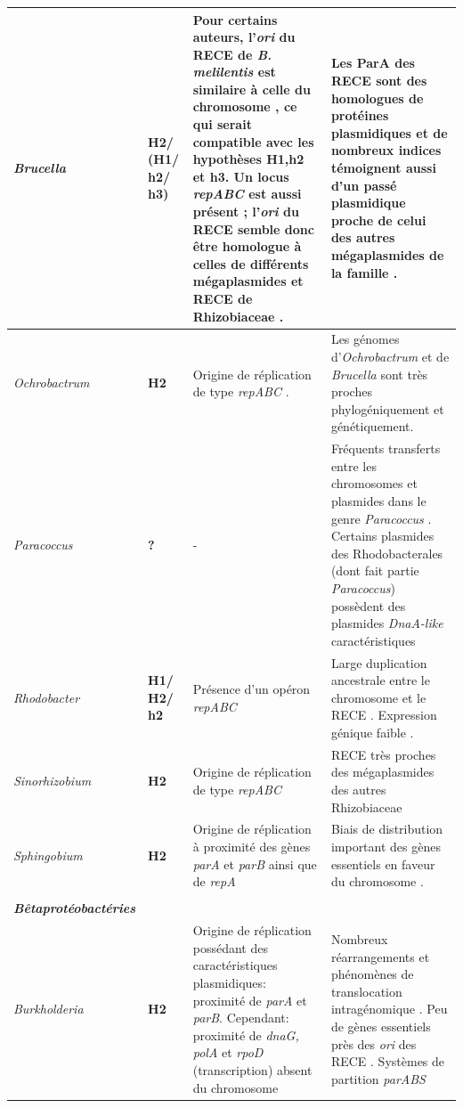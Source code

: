 \begin{longtable}{@{\hspace{-2cm}} >{\footnotesize\itshape}p{} | >{\bfseries\scriptsize}p{} | >{\scriptsize}p{} | >{\scriptsize}p{} @{\hspace{0.5cm}}}
	Brucella & H2/ (H1/ h2/ h3) & Pour certains auteurs, l'\textit{ori} du RECE de \textit{B. melilentis} est similaire à celle du chromosome  \citep{delvecchio2002genome}, ce qui serait compatible avec les hypothèses H1,h2 et h3. Un locus \textit{repABC} est aussi présent \citep{MacLellan2004}; l'\textit{ori} du RECE  semble donc être homologue à celles de différents mégaplasmides et RECE de Rhizobiaceae \citep{paulsen2002brucella}. & Les ParA des RECE sont des homologues de protéines plasmidiques \citep{MacLellan2004} et de nombreux indices témoignent aussi d'un passé plasmidique proche de celui des autres mégaplasmides de la famille \citep{Slater2009}.\\
     \hline
      Ochrobactrum & H2 & Origine de réplication de type \textit{repABC} \citep{chain2011genome}. & Les génomes d'\textit{Ochrobactrum} et de \textit{Brucella} sont très proches phylogéniquement et génétiquement.\\
     \hline
	Paracoccus & ? & \centering - & Fréquents transferts entre les chromosomes et plasmides dans le genre \textit{Paracoccus} \citep{maj2013plasmids}. Certains plasmides des Rhodobacterales (dont fait partie \textit{Paracoccus}) possèdent des plasmides \textit{DnaA-like} caractéristiques \citep{petersen2011origin}\\
	\hline
	Rhodobacter & H1/ H2/ h2 & Présence d'un opéron \textit{repABC} \citep{Mackenzie2007} & Large duplication ancestrale entre le chromosome et le RECE \citep{Choudhary2004}. Expression génique faible  \citep{Mackenzie2007}. \\ 
	\hline
      Sinorhizobium & H2 & Origine de réplication de type \textit{repABC} \citep{barnett2001nucleotide,Slater2009} & RECE très proches des mégaplasmides des autres Rhizobiaceae \citep{Slater2009} \\
	\hline
      Sphingobium & H2 & Origine de réplication à proximité des gènes \textit{parA} et \textit{parB} ainsi que de \textit{repA} \citep{Copley2012} & Biais de distribution important des gènes essentiels en faveur du chromosome \citep{Copley2012}. \\ 
	\hline
	\multicolumn{1}{@{\hspace{-2cm}}} {} \\
	\multicolumn{4}{@{\hspace{-2cm}} p{\textwidth}} {\textbf{Bêtaprotéobactéries}}\\
	Burkholderia & H2 & Origine de réplication possédant des caractéristiques plasmidiques: proximité de \textit{parA} et \textit{parB}. Cependant: proximité de \textit{dnaG, polA} et \textit{rpoD} (transcription) absent du chromosome \citep{holden2004genomic} & Nombreux réarrangements et phénomènes de translocation intragénomique \citep{komatsu2003distribution,Guo2010}. Peu de gènes essentiels près des \textit{ori} des RECE \citep{Nagata2005}. Systèmes de partition \textit{parABS} \citep{morrow2012evolutionary,Passot2012,Dubarry2006a}\\

\end{longtable}
